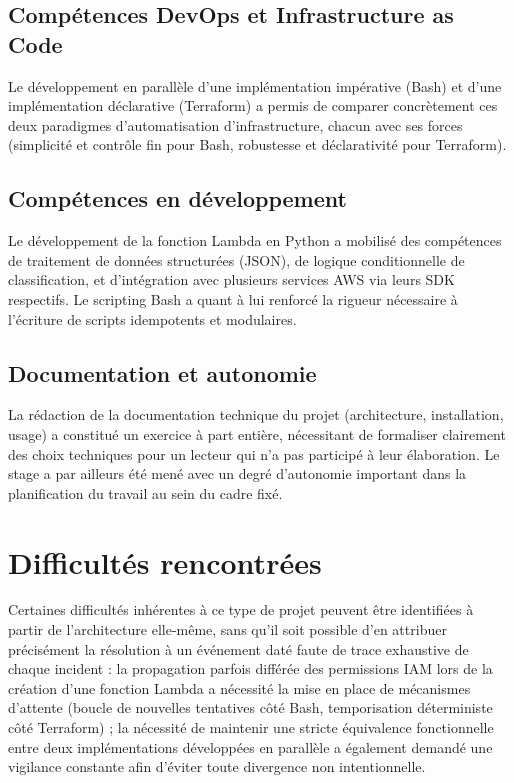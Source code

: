 \documentclass[11pt,a4paper]{report}
\begin{document}
\subsection{Compétences DevOps et Infrastructure as Code}
Le développement en parallèle d'une implémentation impérative (Bash) et d'une implémentation déclarative (Terraform) a permis de comparer concrètement ces deux paradigmes d'automatisation d'infrastructure, chacun avec ses forces (simplicité et contrôle fin pour Bash, robustesse et déclarativité pour Terraform).

\subsection{Compétences en développement}
Le développement de la fonction Lambda en Python a mobilisé des compétences de traitement de données structurées (JSON), de logique conditionnelle de classification, et d'intégration avec plusieurs services AWS via leurs SDK respectifs. Le scripting Bash a quant à lui renforcé la rigueur nécessaire à l'écriture de scripts idempotents et modulaires.

\subsection{Documentation et autonomie}
La rédaction de la documentation technique du projet (architecture, installation, usage) a constitué un exercice à part entière, nécessitant de formaliser clairement des choix techniques pour un lecteur qui n'a pas participé à leur élaboration. Le stage a par ailleurs été mené avec un degré d'autonomie important dans la planification du travail au sein du cadre fixé.

\section{Difficultés rencontrées}

Certaines difficultés inhérentes à ce type de projet peuvent être identifiées à partir de l'architecture elle-même, sans qu'il soit possible d'en attribuer précisément la résolution à un événement daté faute de trace exhaustive de chaque incident : la propagation parfois différée des permissions IAM lors de la création d'une fonction Lambda a nécessité la mise en place de mécanismes d'attente (boucle de nouvelles tentatives côté Bash, temporisation déterministe côté Terraform) ; la nécessité de maintenir une stricte équivalence fonctionnelle entre deux implémentations développées en parallèle a également demandé une vigilance constante afin d'éviter toute divergence non intentionnelle.
\end{document}
